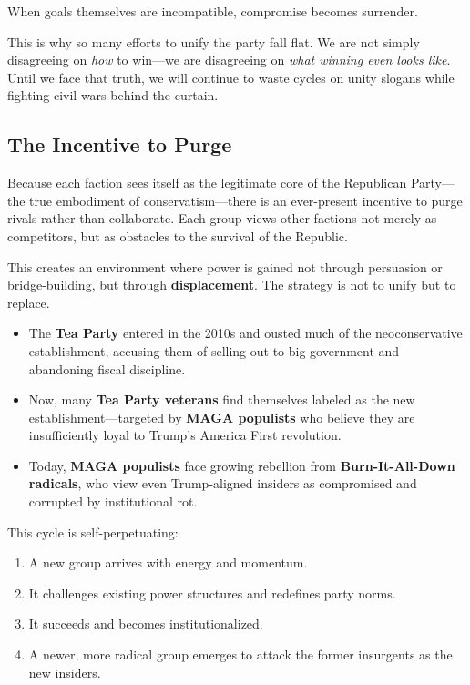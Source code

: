 When goals themselves are incompatible, compromise becomes surrender.

This is why so many efforts to unify the party fall flat. We are not simply disagreeing on \textit{how} to win—we are disagreeing on \textit{what winning even looks like}. Until we face that truth, we will continue to waste cycles on unity slogans while fighting civil wars behind the curtain.


\subsection{The Incentive to Purge}

Because each faction sees itself as the legitimate core of the Republican Party—the true embodiment of conservatism—there is an ever-present incentive to purge rivals rather than collaborate. Each group views other factions not merely as competitors, but as obstacles to the survival of the Republic.

This creates an environment where power is gained not through persuasion or bridge-building, but through \textbf{displacement}. The strategy is not to unify but to replace.

\begin{itemize}
\item The \textbf{Tea Party} entered in the 2010s and ousted much of the neoconservative establishment, accusing them of selling out to big government and abandoning fiscal discipline.
\item Now, many \textbf{Tea Party veterans} find themselves labeled as the new establishment—targeted by \textbf{MAGA populists} who believe they are insufficiently loyal to Trump’s America First revolution.
\item Today, \textbf{MAGA populists} face growing rebellion from \textbf{Burn-It-All-Down radicals}, who view even Trump-aligned insiders as compromised and corrupted by institutional rot.
\end{itemize}

This cycle is self-perpetuating:

\begin{enumerate}
\item A new group arrives with energy and momentum.
\item It challenges existing power structures and redefines party norms.
\item It succeeds and becomes institutionalized.
\item A newer, more radical group emerges to attack the former insurgents as the new insiders.
\end{enumerate}

